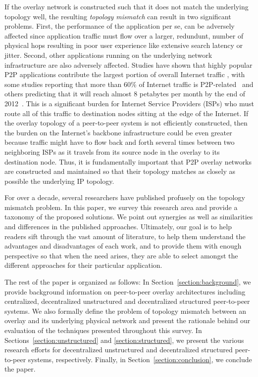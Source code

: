 If the overlay network is constructed such that it does not match the underlying
topology well, the resulting \emph{topology mismatch} 
can result in two
significant problems. First, the performance of the application per se, can be
adversely affected since application traffic must flow over a larger,
redundunt, number of physical hops resulting in poor user experience like
extensive search latency or jitter. Second, other applications running
on the underlying network infrastructure are also adversely affected.
Studies have shown that highly popular P2P applications contribute the largest
portion of overall Internet traffic
\cite{seroiu_analysiscds_2002,sen_analyzep2ptraffic_2004,krp_ispfear_2005}, with
some studies reporting that more than 60\% of Internet traffic is
P2P-related~\cite{cachelogic,ipoque2007,ipoque2009} and others predicting that it
will reach almost
8 petabytes per month by the end of
2012~\cite{multinteligence}. This is a significant burden for Internet Service
Providers (ISPs) who must route all of this traffic to destination nodes sitting
at the edge of the Internet. If the overlay topology of a peer-to-peer system is
not efficiently constructed, then the burden on the Internet's backbone
infrastructure could be even greater because traffic might have to flow
back and forth several times between two neighboring ISPs as it travels from its
source node in the overlay to its destination node. Thus, it is fundamentally
important that P2P overlay networks are constructed and maintained so that
their topology matches as closely as possible the underlying IP topology. 

For over a decade, several researchers have published profusely on the topology
mismatch problem.  In this paper, we survey this research area and provide a
taxonomy of the proposed solutions. We point out synergies as well as
similarities and differences in the published approaches. Ultimately, our goal
is to help readers sift through the vast amount of literature, to help them
understand the advantages and disadvantages of each work, and to provide
them with enough perspective so that when the need arises, they are able to
select amongst the different approaches for their particular application.

The rest of the paper is organized as follows: In
Section~\ref{section:background}, we provide background information on
peer-to-peer overlay architectures including centralized, decentralized
unstructured and decentralized structured peer-to-peer systems. We also formally
define the problem of topology mismatch between an overlay and its underlying
physical network and present the rationale behind our 
evaluation of the techniques presented throughout this survey. In
Sections~\ref{section:unstructured} and \ref{section:structured}, we present the
various research efforts for decentralized unstructured and decentralized
structured peer-to-peer systems, respectively. Finally, in 
Section~\ref{section:conclusion}, we conclude the paper.
